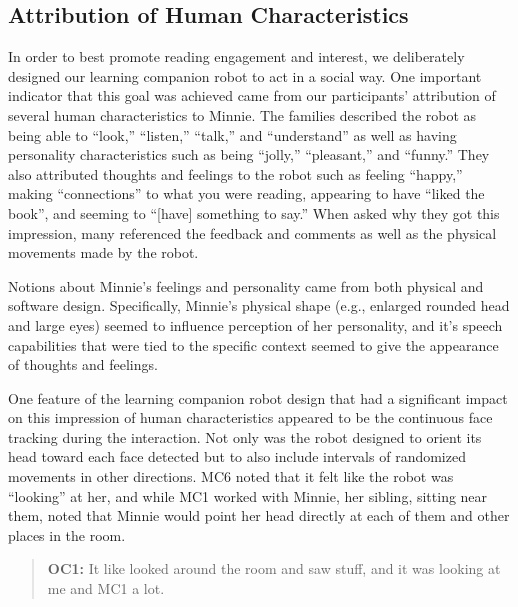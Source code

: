 \documentclass{sigchi}
\begin{document}
\subsection{Attribution of Human Characteristics}
In order to best promote reading engagement and interest, we deliberately designed our learning companion robot to act in a social way. One important indicator that this goal was achieved came from our participants' attribution of several human characteristics to Minnie. The families described the robot as being able to ``look,'' ``listen,'' ``talk,'' and ``understand'' as well as having personality characteristics such as being ``jolly,'' ``pleasant,'' and ``funny.'' They also attributed thoughts and feelings to the robot such as feeling ``happy,'' making ``connections'' to what you were reading, appearing to have ``liked the book'', and seeming to ``[have] something to say.'' When asked why they got this impression, many referenced the feedback and comments as well as the physical movements made by the robot. 

Notions about Minnie's feelings and personality came from both physical and software design. Specifically, Minnie's physical shape (e.g., enlarged rounded head and large eyes) seemed to influence perception of her personality, and it's speech capabilities that were tied to the specific context seemed to give the appearance of thoughts and feelings. 

One feature of the learning companion robot design that had a significant impact on this impression of human characteristics appeared to be the continuous face tracking during the interaction. Not only was the robot designed to orient its head toward each face detected but to also include intervals of randomized movements in other directions. MC6 noted that it felt like the robot was ``looking'' at her, and while MC1 worked with Minnie, her sibling, sitting near them, noted that Minnie would point her head directly at each of them and other places in the room.


	 \begin{quote}
	 	 \textbf{OC1:} It like looked around the room and saw stuff, and it was looking at me and MC1 a lot.
	 \end{quote}
	
\end{document}
